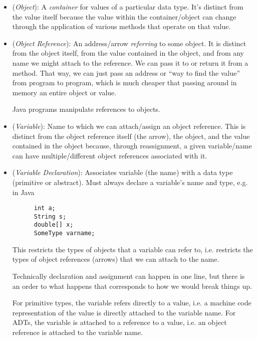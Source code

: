 \documentclass[12pt]{article}
\theoremstyle{plain}
\theoremstyle{definition}
\theoremstyle{remark}
\begin{document}
\begin{itemize}
  \item (\emph{Object}):
    A \emph{container} for values of a particular data type.
    It's distinct from the value itself because the value within the
    container/object can change through the application of various
    methods that operate on that value.

  \item (\emph{Object Reference}):
    An address/arrow \emph{referring} to some object.
    It is distinct from the object itself, from the value contained in
    the object, and from any name we might attach to the reference.
    We can pass it to or return it from a method.
    That way, we can just pass an address or ``way to find the
    value'' from program to program, which is much cheaper that passing
    around in memory an entire object or value.

    Java programs manipulate references to objects.

  \item (\emph{Variable}):
    Name to which we can attach/assign an object reference.
    This is distinct from the object reference itself (the arrow),
    the object, and the value contained in the object because,
    through reassignment, a given variable/name can have
    multiple/different object references associated with it.

  \item (\emph{Variable Declaration}):
    Associates variable (the name) with a data type (primitive or
    abstract).
    Must always declare a variable's name and type, e.g.
    in Java
    \begin{lstlisting}
      int a;
      String s;
      double[] x;
      SomeType varname;
    \end{lstlisting}
    This restricts the types of objects that a variable can refer to,
    i.e. restricts the types of object references (arrows) that we can
    attach to the name.

    Technically declaration and assignment can happen in one line, but
    there is an order to what happens that corresponds to how we would
    break things up.

    For primitive types, the variable refers directly to a value, i.e. a
    machine code representation of the value is directly attached to the
    variable name.
    For ADTs, the variable is attached to a reference to a value, i.e. an
    object reference is attached to the variable name.


\end{itemize}
\end{document}
